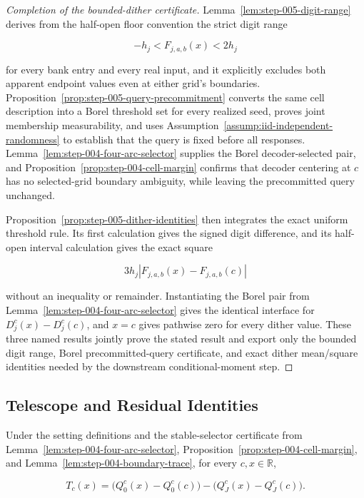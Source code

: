 \begin{proof}[Completion of the bounded-dither certificate]
Lemma~\ref{lem:step-005-digit-range} derives from the half-open floor convention the strict digit range

\[
-h_j<F_{j,a,b}(x)<2h_j
\]

for every bank entry and every real input, and it explicitly excludes both apparent endpoint values even at either grid's boundaries. Proposition~\ref{prop:step-005-query-precommitment} converts the same cell description into a Borel threshold set for every realized seed, proves joint membership measurability, and uses Assumption~\ref{assump:iid-independent-randomness} to establish that the query is fixed before all responses. Lemma~\ref{lem:step-004-four-arc-selector} supplies the Borel decoder-selected pair, and Proposition~\ref{prop:step-004-cell-margin} confirms that decoder centering at \(c\) has no selected-grid boundary ambiguity, while leaving the precommitted query unchanged.

Proposition~\ref{prop:step-005-dither-identities} then integrates the exact uniform threshold rule. Its first calculation gives the signed digit difference, and its half-open interval calculation gives the exact square

\[
3h_j|F_{j,a,b}(x)-F_{j,a,b}(c)|
\]

without an inequality or remainder. Instantiating the Borel pair from Lemma~\ref{lem:step-004-four-arc-selector} gives the identical interface for \(D_j^c(x)-D_j^c(c)\), and \(x=c\) gives pathwise zero for every dither value. These three named results jointly prove the stated result and export only the bounded digit range, Borel precommitted-query certificate, and exact dither mean/square identities needed by the downstream conditional-moment step.
\end{proof}

\subsection{Telescope and Residual Identities}\label{app:step-006}

\begin{lemma}\label{lem:step-006-finite-telescope}
Under the setting definitions and the stable-selector certificate from Lemma~\ref{lem:step-004-four-arc-selector}, Proposition~\ref{prop:step-004-cell-margin}, and Lemma~\ref{lem:step-004-boundary-trace}, for every \(c,x\in\mathbb R\),

\[
T_c(x)
=\bigl(Q_0^c(x)-Q_0^c(c)\bigr)
-\bigl(Q_J^c(x)-Q_J^c(c)\bigr).
\]
\end{lemma}

